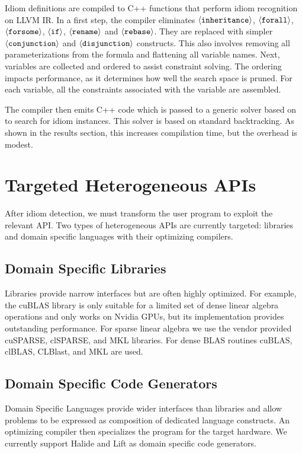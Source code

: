     Idiom definitions are compiled to C++ functions that perform idiom
    recognition on LLVM IR.
    In a first step, the compiler eliminates
    $\left<\text{\tt inheritance}\right>$, $\left<\text{\tt forall}\right>$,
    $\left<\text{\tt forsome}\right>$, $\left<\text{\tt if}\right>$,
    $\left<\text{\tt rename}\right>$ and $\left<\text{\tt rebase}\right>$.
    They are replaced with simpler $\left<\text{\tt conjunction}\right>$ and
    $\left<\text{\tt disjunction}\right>$ constructs.
    This also involves removing all parameterizations from the formula and
    flattening all variable names.
    Next, variables are collected and ordered to assist constraint solving.
    The ordering impacts performance, as it determines how well the search space
    is pruned. 
    For each variable, all the constraints associated with the variable are
    assembled.

    The compiler then emits C++ code which is passed to a generic solver based on \cite{ginsbach2017discovery} to search for idiom instances.
    This solver is based on standard backtracking.
    As shown in the results section, this increases compilation time, but the overhead is modest.

\section{Targeted Heterogeneous APIs}

    After idiom detection, we must transform the user program to exploit the
    relevant API.
    Two types of heterogeneous APIs are currently targeted: libraries and domain
    specific languages with their optimizing compilers.

    \subsection{Domain Specific Libraries}
    Libraries provide narrow interfaces but are often highly optimized.
    For example, the cuBLAS library is only suitable for a limited set of dense
    linear algebra operations and only works on Nvidia GPUs, but its
    implementation provides outstanding performance.
    For sparse linear algebra we use the vendor provided cuSPARSE, clSPARSE, and
    MKL libraries.
    For dense BLAS routines cuBLAS, clBLAS, CLBlast, and MKL are used.

    \subsection{Domain Specific Code Generators}
    Domain Specific Languages provide wider interfaces than libraries and allow
    problems to be expressed as composition of dedicated language constructs.
    An optimizing compiler then specializes the program for the target hardware.
    We currently support Halide and Lift as domain specific code generators.

